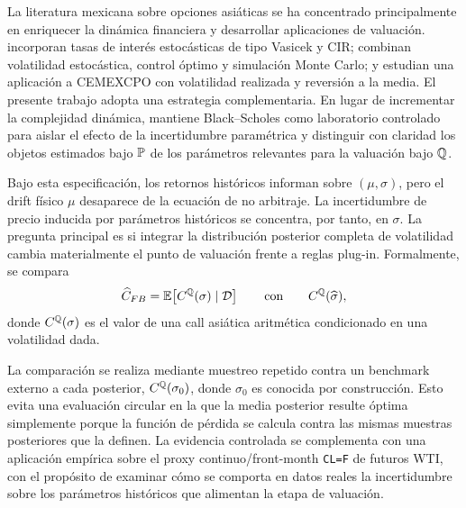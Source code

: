 La literatura mexicana sobre opciones asiáticas se ha concentrado principalmente en enriquecer la dinámica financiera y desarrollar aplicaciones de valuación. \citet{ortiz2016} incorporan tasas de interés estocásticas de tipo Vasicek y CIR; \citet{matias2019} combinan volatilidad estocástica, control óptimo y simulación Monte Carlo; y \citet{ortizjimenez2026} estudian una aplicación a CEMEXCPO con volatilidad realizada y reversión a la media. El presente trabajo adopta una estrategia complementaria. En lugar de incrementar la complejidad dinámica, mantiene Black--Scholes como laboratorio controlado para aislar el efecto de la incertidumbre paramétrica y distinguir con claridad los objetos estimados bajo $\mathbb{P}$ de los parámetros relevantes para la valuación bajo $\mathbb{Q}$.

Bajo esta especificación, los retornos históricos informan sobre $(\mu,\sigma)$, pero el drift físico $\mu$ desaparece de la ecuación de no arbitraje. La incertidumbre de precio inducida por parámetros históricos se concentra, por tanto, en $\sigma$. La pregunta principal es si integrar la distribución posterior completa de volatilidad cambia materialmente el punto de valuación frente a reglas plug-in. Formalmente, se compara
\begin{equation}
 \widehat C_{FB}=\mathbb{E}\!\left[C^{\mathbb{Q}}(\sigma)\mid\mathcal D\right]
 \qquad\text{con}\qquad
 C^{\mathbb{Q}}(\widehat\sigma),
 \label{eq:main_question}
\end{equation}
donde $C^{\mathbb{Q}}(\sigma)$ es el valor de una call asiática aritmética condicionado en una volatilidad dada.

La comparación se realiza mediante muestreo repetido contra un benchmark externo a cada posterior, $C^{\mathbb{Q}}(\sigma_0)$, donde $\sigma_0$ es conocida por construcción. Esto evita una evaluación circular en la que la media posterior resulte óptima simplemente porque la función de pérdida se calcula contra las mismas muestras posteriores que la definen. La evidencia controlada se complementa con una aplicación empírica sobre el proxy continuo/front-month \texttt{CL=F} de futuros WTI, con el propósito de examinar cómo se comporta en datos reales la incertidumbre sobre los parámetros históricos que alimentan la etapa de valuación.

